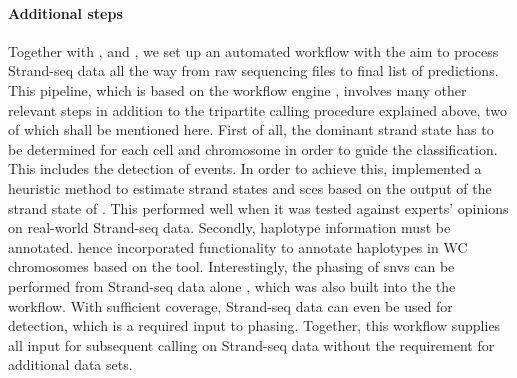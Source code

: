 
\paragraph{Additional steps}
Together with \maryam, \marschall and \david, we set up an automated workflow
with the aim to process Strand-seq data all the way from raw sequencing files to
final list of \sv predictions. This pipeline, which is based on the workflow
engine \snakemake, involves many other relevant steps in addition to the
tripartite calling procedure explained above, two of which shall be mentioned
here. First of all, the dominant strand state has to be determined for each cell
and chromosome in order to guide the \sv classification. This includes the
detection of \sce events. In order to achieve this, \venla implemented a
heuristic method to estimate strand states and \acp{sce} based on the output of
the strand state \hmm of \mc. This performed well when it was tested against experts'
opinions on real-world Strand-seq data. Secondly, haplotype information must be
annotated. \david hence incorporated functionality to annotate haplotypes in WC
chromosomes based on the \strandphaser tool. Interestingly, the phasing of \acp{snv}
can be performed from Strand-seq data alone \citep{Porubsky2016}, which was also
built into the the workflow. With sufficient coverage, Strand-seq data can
even be used for \snv detection, which is a required input to phasing. Together,
this workflow supplies all input for subsequent \sv calling on Strand-seq data
without the requirement for additional data sets.






